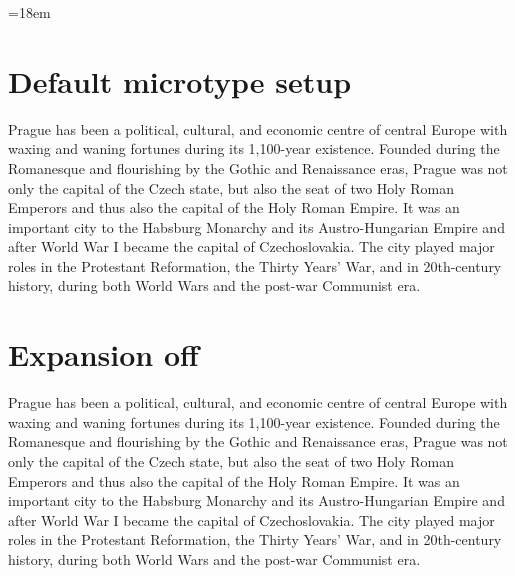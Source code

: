\documentclass{article}
\begin{document}
\hsize=18em

\def\sample{Prague has been a political, cultural, and economic centre of central Europe
with waxing and waning fortunes during its 1,100-year existence. Founded during
the Romanesque and flourishing by the Gothic and Renaissance eras, Prague was
not only the capital of the Czech state, but also the seat of two Holy Roman
Emperors and thus also the capital of the Holy Roman Empire. It was an
important city to the Habsburg Monarchy and its Austro-Hungarian Empire and
after World War I became the capital of Czechoslovakia. The city played major
roles in the Protestant Reformation, the Thirty Years' War, and in 20th-century
history, during both World Wars and the post-war Communist era.}

\section{Default microtype setup}
\sample

\section{Expansion off}

\sample
\end{document}
